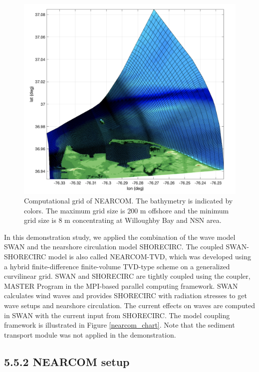 \documentclass[11pt]{article}
\begin{document}
\begin{figure}[h!]
\centering
\includegraphics[width=\textwidth]{./figures/nearcom_grid.png}
\caption{Computational grid of NEARCOM. The bathymetry is indicated by colors. The maximum grid size is 200 m offshore and the minimum grid size is 8 m concentrating at Willoughby Bay and NSN area.}
\label{nearcom_grid}
\centering
\end{figure}

In this demonstration study, we applied the combination of the wave model SWAN and the nearshore circulation model SHORECIRC. The coupled SWAN-SHORECIRC model is also called NEARCOM-TVD, which was developed using a hybrid finite-difference finite-volume TVD-type scheme on a generalized curvilinear grid. SWAN and SHORECIRC are tightly coupled using the coupler, MASTER Program in the MPI-based parallel computing framework. SWAN calculates wind waves and provides SHORECIRC with radiation stresses to get wave setups and nearshore circulation. The current effects on waves are computed in SWAN with the current input from SHORECIRC. The model coupling framework is illustrated in Figure \ref{nearcom_chart}. Note that the sediment transport module was not applied in the demonstration.

\subsection*{5.5.2 NEARCOM setup}
\end{document}

